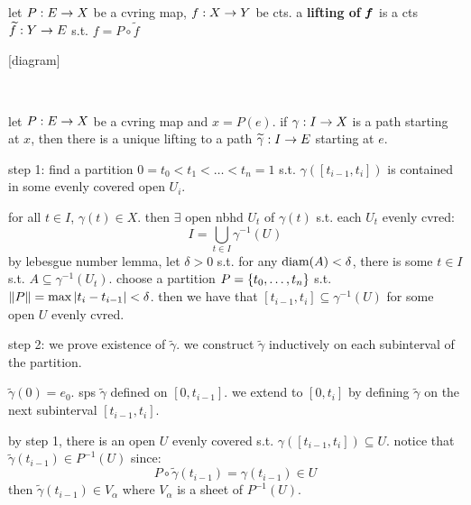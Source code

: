 \begin{defn}
    let $P:E\rightarrow X$ be a cvring map, $f:X\rightarrow Y$ be cts.
    a \textbf{lifting of} $\bm{f}$ is a cts $\widetilde{f}:Y\rightarrow E$ s.t. $f=P\circ\tilde{f}$
    
    [diagram]
\end{defn} \

\begin{lm}[title=Path-lifting property]
    let $P:E\rightarrow X$ be a cvring map and $x=P(e)$.
    if $\gamma:I\rightarrow X$ is a path starting at $x$, then there is a unique lifting to a path
    $\widetilde{\gamma}:I\rightarrow E$ starting at $e$.
\end{lm}

\begin{pf}[source=Primary Source Material]
    step 1: find a partition $0=t_{0}<t_{1}<\dots<t_{n}=1$ s.t. $\gamma([t_{i-1},t_{i}])$ is
    contained in some evenly covered open $U_{i}$.
    \begin{block}
        for all $t\in I$, $\gamma(t)\in X$.
        then $\exists$ open nbhd $U_{t}$ of $\gamma(t)$ s.t. each $U_{t}$ evenly cvred:
        \begin{equation*}
            I=\bigcup_{t\in I}\gamma^{-1}(U_{})
        \end{equation*}
        by lebesgue number lemma, let $\delta>0$ s.t. for any $\textrm{diam}(A)<\delta$,
        there is some $t\in I$ s.t. $A\subseteq\gamma^{-1}(U_{t})$.
        choose a partition $P=\left\{{t_{0},\dots,t_{n}}\right\}$ s.t.
        $\norm{P}=\max\abs{t_{i}-t_{i-1}}<\delta$.
        then we have that $[t_{i-1},t_{i}]\subseteq\gamma^{-1}(U)$ for some open $U$ evenly cvred.
    \end{block}
    step 2: we prove existence of $\tilde{\gamma}$.
    we construct $\tilde{\gamma}$ inductively on each subinterval of the partition.
    \begin{block}
        $\tilde{\gamma}(0)=e_{0}$.
        sps $\tilde{\gamma}$ defined on $[0,t_{i-1}]$.
        we extend to $[0, t_{i}]$ by defining $\tilde{\gamma}$ on the next
        subinterval $[t_{i-1},t_{i}]$.

        by step 1, there is an open $U$ evenly covered s.t. $\gamma([t_{i-1},t_{i}])\subseteq U$.
        notice that $\tilde{\gamma}(t_{i-1})\in P^{-1}(U)$ since:
        \begin{equation*}
            P\circ\tilde{\gamma}(t_{i-1}) = \gamma(t_{i-1})\in U
        \end{equation*}
        then $\tilde{\gamma}(t_{i-1})\in V_{\alpha}$ where $V_{\alpha}$ is a sheet of $P^{-1}(U)$.


\end{block}
\end{pf}
